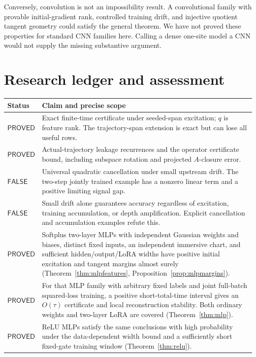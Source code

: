 \documentclass[12pt,a4paper]{article}
\theoremstyle{readable}
\theoremstyle{definition}\newtheorem{example}[theorem]{Example}
\newcommand{\PP}{\mathsf{PROVED}}\newcommand{\FF}{\mathsf{FALSE}}
\begin{document}
Conversely, convolution is not an impossibility result. A convolutional family with provable initial-gradient rank, controlled training drift, and injective quotient tangent geometry could satisfy the general theorem. We have not proved these properties for standard CNN families here. Calling a dense one-site model a CNN would not supply the missing substantive argument.

\section{Research ledger and assessment}
\label{sec:ledger}

\begin{longtable}{@{}p{31mm}p{114mm}@{}}
\toprule Status & Claim and precise scope\\\midrule\endhead
\(\PP\)& Exact finite-time certificate under seeded-span excitation; \(q\) is feature rank. The trajectory-span extension is exact but can lose all useful rows.\\
\(\PP\)& Actual-trajectory leakage recurrences and the operator certificate bound, including subspace rotation and projected \(A\)-closure error.\\
\(\FF\)& Universal quadratic cancellation under small upstream drift. The two-step jointly trained example has a nonzero linear term and a positive limiting signal gap.\\
\(\FF\)& Small drift alone guarantees accuracy regardless of excitation, training accumulation, or depth amplification. Explicit cancellation and accumulation examples refute this.\\
\(\PP\)& Softplus two-layer MLPs with independent Gaussian weights and biases, distinct fixed inputs, an independent immersive chart, and sufficient hidden/output/LoRA widths have positive initial excitation and tangent margins almost surely (Theorem~\ref{thm:mlpfeatures}, Proposition~\ref{prop:mlpmargins}).\\
\(\PP\)& For that MLP family with arbitrary fixed labels and joint full-batch squared-loss training, a positive short-total-time interval gives an \(O(\tau)\) certificate and local reconstruction stability. Both ordinary weights and two-layer LoRA are covered (Theorem~\ref{thm:mlp}).\\
\(\PP\)& ReLU MLPs satisfy the same conclusions with high probability under the data-dependent width bound and a sufficiently short fixed-gate training window (Theorem~\ref{thm:relu}).\\

\end{longtable}
\end{document}
